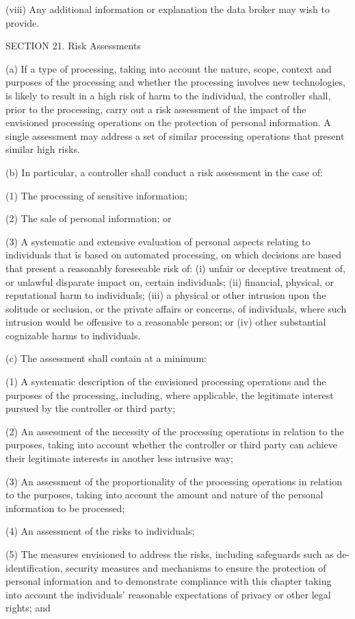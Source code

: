 (viii) Any additional information or explanation the data broker may wish to provide.

SECTION 21. Risk Assessments

(a) If a type of processing, taking into account the nature, scope, context and purposes of the processing and whether the processing involves new technologies, is likely to result in a high risk of harm to the individual, the controller shall, prior to the processing, carry out a risk assessment of the impact of the envisioned processing operations on the protection of personal information. A single assessment may address a set of similar processing operations that present similar high risks.

(b) In particular, a controller shall conduct a risk assessment in the case of:

(1) The processing of sensitive information;  

(2) The sale of personal information; or

(3) A systematic and extensive evaluation of personal aspects relating to individuals that is based on automated processing, on which decisions are based that present a reasonably foreseeable risk of: (i) unfair or deceptive treatment of, or unlawful disparate impact on, certain individuals; (ii) financial, physical, or reputational harm to individuals; (iii) a physical or other intrusion upon the solitude or seclusion, or the private affairs or concerns, of individuals, where such intrusion would be offensive to a reasonable person; or (iv) other substantial cognizable harms to individuals.

(c) The assessment shall contain at a minimum:

(1) A systematic description of the envisioned processing operations and the purposes of the processing, including, where applicable, the legitimate interest pursued by the controller or third party;

(2) An assessment of the necessity of the processing operations in relation to the purposes, taking into account whether the controller or third party can achieve their legitimate interests in another less intrusive way;

(3) An assessment of the proportionality of the processing operations in relation to the purposes, taking into account the amount and nature of the personal information to be processed;

(4) An assessment of the risks to individuals;

(5) The measures envisioned to address the risks, including safeguards such as de-identification, security measures and mechanisms to ensure the protection of personal information and to demonstrate compliance with this chapter taking into account the individuals’ reasonable expectations of privacy or other legal rights; and 

